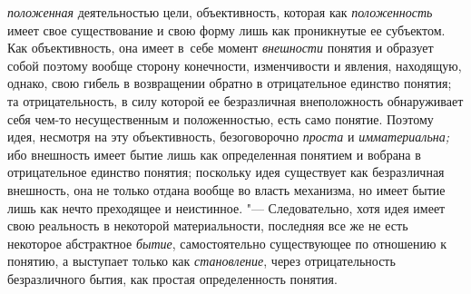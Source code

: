 {\em положенная}
деятельностью цели, объективность, которая как
{\em положенность} имеет
свое существование и свою форму лишь как проникнутые ее субъектом. Как
объективность, она имеет в~себе момент
{\em внешности} понятия и
образует собой поэтому вообще сторону конечности, изменчивости и явления,
находящую, однако, свою гибель в возвращении обратно в отрицательное
единство понятия; та отрицательность, в силу которой ее безразличная
внеположность обнаруживает себя чем-то несущественным и положенностью, есть
само понятие. Поэтому идея, несмотря на эту объективность, безоговорочно
{\em проста} и {\em имматериальна;} ибо
внешность имеет бытие лишь как определенная понятием и вобрана в
отрицательное единство понятия; поскольку идея существует как безразличная
внешность, она не только отдана вообще во власть механизма, но имеет бытие
лишь как нечто преходящее и неистинное. "--- Следовательно,
хотя идея имеет свою реальность в некоторой материальности, последняя все
же не есть некоторое абстрактное
{\em бытие},
самостоятельно существующее по отношению к понятию, а
выступает только как {\em становление},
через отрицательность безразличного бытия, как простая
определенность понятия.

